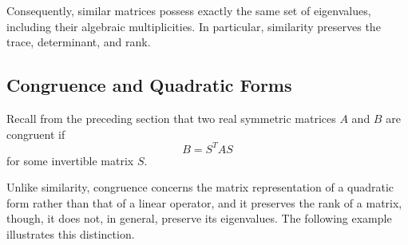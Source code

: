 \documentclass[11pt]{article}
\theoremstyle{definition}
\theoremstyle{remark}
\begin{document}
Consequently, similar matrices possess exactly
the same set of eigenvalues, including their algebraic
multiplicities. In particular, similarity preserves
the trace, determinant, and rank.

\subsection{Congruence and Quadratic Forms}

Recall from the preceding section that two real
symmetric matrices $A$ and $B$ are congruent if
\[
    B=S^TAS
\]
for some invertible matrix $S$.

Unlike similarity, congruence concerns the matrix
representation of a quadratic form rather than
that of a linear operator, and it preserves the rank of a matrix, though,
it does not, in general, preserve its eigenvalues.
The following example illustrates this distinction.
\end{document}
